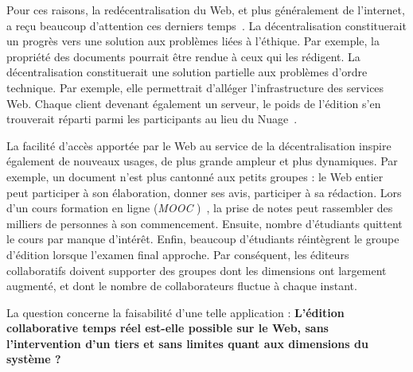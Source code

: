 Pour ces raisons, la redécentralisation du Web, et plus généralement de
l'internet, a reçu beaucoup d'attention ces derniers temps~\cite{benet2014ipfs,
  maelstrom, mansour2016demonstration, wood2014ethereum}.  La décentralisation
constituerait un progrès vers une solution aux problèmes liées à l'éthique.  Par
exemple, la propriété des documents pourrait être rendue à ceux qui les
rédigent. La décentralisation constituerait une solution partielle aux problèmes
d'ordre technique. Par exemple, elle permettrait d'alléger l'infrastructure des
services Web. Chaque client devenant également un serveur, le poids de l'édition
s'en trouverait réparti parmi les participants au lieu du
Nuage~\cite{mell2011national}. 

La facilité d'accès apportée par le Web au service de la décentralisation
inspire également de nouveaux usages, de plus grande ampleur et plus
dynamiques. Par exemple, un document n'est plus cantonné aux petits groupes : le
Web entier peut participer à son élaboration, donner ses avis, participer à sa
rédaction. Lors d'un cours formation en ligne
(\emph{MOOC}%
)~\cite{breslow2013studying}, la prise de notes peut rassembler des milliers de
personnes à son commencement. Ensuite, nombre d'étudiants quittent le cours par
manque d'intérêt. Enfin, beaucoup d'étudiants réintègrent le groupe d'édition
lorsque l'examen final approche.  Par conséquent, les éditeurs collaboratifs
doivent supporter des groupes dont les dimensions ont largement augmenté, et
dont le nombre de collaborateurs fluctue à chaque instant.

La question concerne la faisabilité d'une telle application :
\textbf{L'édition collaborative temps réel est-elle possible sur le Web, sans
  l'intervention d'un tiers et sans limites quant aux dimensions du système ?}

